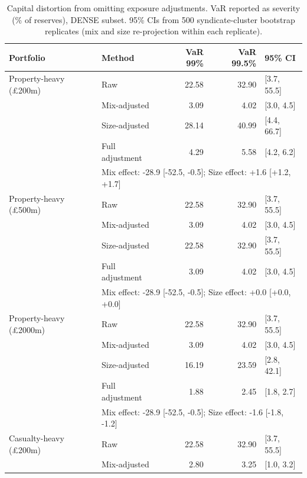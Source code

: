 \begin{table}[htbp]
\centering
\caption{Capital distortion from omitting exposure adjustments.  VaR reported as severity (\% of reserves), DENSE subset.  95\% CIs from 500 syndicate-cluster bootstrap replicates (mix and size re-projection within each replicate).}
\label{tab:capital_distortion}
\begin{tabular}{llrrl}
\toprule
Portfolio & Method & VaR 99\% & VaR 99.5\% & 95\% CI \\
\midrule
Property-heavy (\pounds 200m) & Raw & 22.58 & 32.90 & [3.7, 55.5] \\
 & Mix-adjusted & 3.09 & 4.02 & [3.0, 4.5] \\
 & Size-adjusted & 28.14 & 40.99 & [4.4, 66.7] \\
 & Full adjustment & 4.29 & 5.58 & [4.2, 6.2] \\
 & \multicolumn{4}{l}{\footnotesize Mix effect: -28.9 [-52.5, -0.5]; Size effect: +1.6 [+1.2, +1.7]} \\
\addlinespace
Property-heavy (\pounds 500m) & Raw & 22.58 & 32.90 & [3.7, 55.5] \\
 & Mix-adjusted & 3.09 & 4.02 & [3.0, 4.5] \\
 & Size-adjusted & 22.58 & 32.90 & [3.7, 55.5] \\
 & Full adjustment & 3.09 & 4.02 & [3.0, 4.5] \\
 & \multicolumn{4}{l}{\footnotesize Mix effect: -28.9 [-52.5, -0.5]; Size effect: +0.0 [+0.0, +0.0]} \\
\addlinespace
Property-heavy (\pounds 2000m) & Raw & 22.58 & 32.90 & [3.7, 55.5] \\
 & Mix-adjusted & 3.09 & 4.02 & [3.0, 4.5] \\
 & Size-adjusted & 16.19 & 23.59 & [2.8, 42.1] \\
 & Full adjustment & 1.88 & 2.45 & [1.8, 2.7] \\
 & \multicolumn{4}{l}{\footnotesize Mix effect: -28.9 [-52.5, -0.5]; Size effect: -1.6 [-1.8, -1.2]} \\
\addlinespace
Casualty-heavy (\pounds 200m) & Raw & 22.58 & 32.90 & [3.7, 55.5] \\
 & Mix-adjusted & 2.80 & 3.25 & [1.0, 3.2] \\

\end{tabular}
\end{table}
